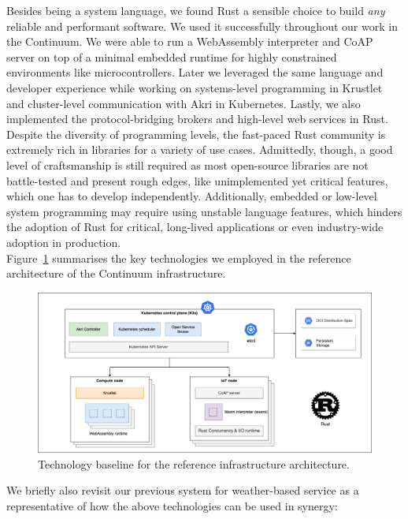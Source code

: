 Besides being a system language, we found Rust a sensible choice to build \emph{any} reliable and performant software. We used it successfully throughout our work in the Continuum. We were able to run a WebAssembly interpreter and CoAP server on top of a minimal embedded runtime for highly constrained environments like microcontrollers. Later we leveraged the same language and developer experience while working on systems-level programming in Krustlet and cluster-level communication with Akri in Kubernetes. Lastly, we also implemented the protocol-bridging brokers and high-level web services in Rust. Despite the diversity of programming levels, the fast-paced Rust community is extremely rich in libraries for a variety of use cases. Admittedly, though, a good level of craftsmanship is still required as most open-source libraries are not battle-tested and present rough edges, like unimplemented yet critical features, which one has to develop independently. Additionally, embedded or low-level system programming may require using unstable language features, which hinders the adoption of Rust for critical, long-lived applications or even industry-wide adoption in production.\\

Figure~\ref{fig:architecture-technologies} summarises the key technologies we employed in the reference architecture of the Continuum infrastructure.

\begin{figure}[ht]
\centering
\includegraphics[width=\columnwidth]{figures/architecture-technologies}
\caption{Technology baseline for the reference infrastructure architecture.} \label{fig:architecture-technologies}
\end{figure}

We briefly also revisit our previous system for weather-based service as a representative of how the above technologies can be used in synergy:


